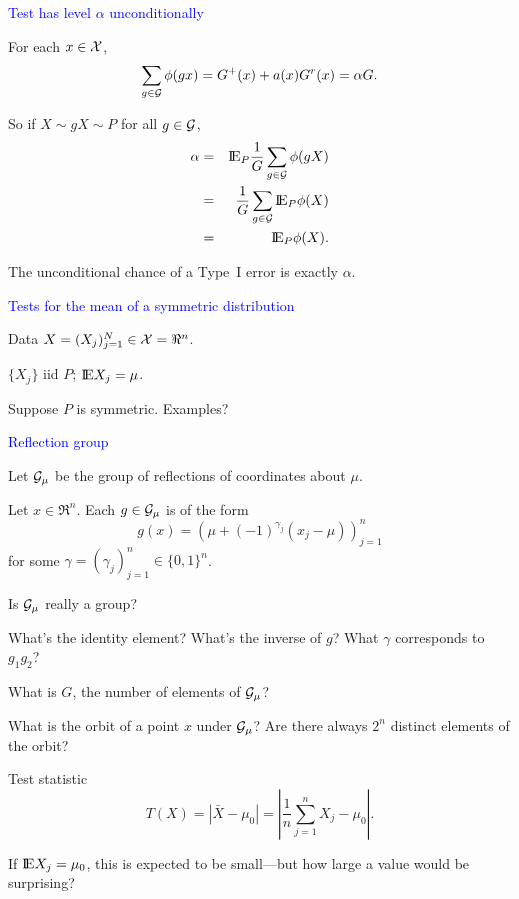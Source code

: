 \documentclass[landscape]{slides}
\newcommand{\EE}{\hbox{I\kern-.1667em\hbox{E}}}
\newcommand{\cG}{{\cal G}}
\newcommand{\cX}{{\cal X}}
\newcommand{\beq}{\begin{equation}}
\newcommand{\eeq}{\end{equation}}
\begin{document}
\begin{slide}
{\textcolor{blue}{Test has level $\alpha$ unconditionally}}

For each $x \in \cX$,
\beq
    \sum_{g \in \cG} \phi(gx) = G^+(x) + a(x) G^r(x) = \alpha G.
\eeq

So if $X \sim gX \sim P$ for all $g \in \cG$,
\begin{eqnarray}
  \alpha & = & \EE_P \frac{1}{G}\sum_{g \in \cG} \phi(gX) \nonumber \\
             & = & \frac{1}{G}\sum_{g \in \cG} \EE_P \phi(X) \nonumber \\
             & = & \EE_P \phi(X).
\end{eqnarray}

The unconditional chance of a Type~I error is exactly $\alpha$.

\end{slide}

\begin{slide}
{\textcolor{blue}{Tests for the mean of a symmetric distribution}}

Data $X = (X_j )_{j=1}^N \in \cX = \Re^n$.

$\{ X_j \}$ iid $P$; $\EE X_j = \mu$.

Suppose $P$ is symmetric.  Examples?

\end{slide}

\begin{slide}
{\textcolor{blue}{Reflection group}}

Let $\cG_\mu$ be the group of reflections of coordinates about $\mu$.

Let $x \in \Re^n$.
Each $g \in \cG_\mu$ is of the form
\beq
    g(x) = (\mu + (-1)^{\gamma_j}(x_j - \mu))_{j=1}^n
\eeq
for some $\gamma = (\gamma_j)_{j=1}^n \in \{0, 1\}^n$.

Is $\cG_\mu$ really a group?

What's the identity element?  
What's the inverse of $g$?  
What $\gamma$ corresponds to $g_1g_2$?

What is $G$, the number of elements of $\cG_\mu$?

\end{slide}

\begin{slide}

What is the orbit of a point $x$ under $\cG_\mu$?  
Are there always $2^n$ distinct elements of the orbit?

Test statistic 
\beq
   T(X) = | \bar{X} - \mu_0 | = \left | \frac{1}{n} \sum_{j=1}^n X_j - \mu_0 \right |.
\eeq

If $\EE X_j = \mu_0$, this is expected to be small---but how large a value would
be surprising?

\end{slide}
\end{document}
